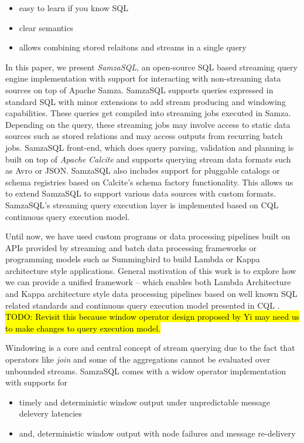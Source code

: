 \documentclass[10pt, conference, compsocconf]{IEEEtran}
\begin{document}
\begin{itemize}
\item easy to learn if you know SQL
\item clear semantics 
\item allows combining stored relaitons and streams in a single query
\end{itemize}

In this paper, we present \textit{SamzaSQL}, an open-source SQL based  streaming query engine implementation with support for interacting with non-streaming data sources on top of Apache Samza. SamzaSQL supports queries expressed in standard SQL with minor extensions to add stream producing and windowing capabilities. These queries get compiled into streaming jobs executed in Samza. Depending on the query, these streaming jobs may involve access to static data sources such as stored relations and may access outputs from recurring batch jobs. SamzaSQL front-end, which does query parsing, validation and planning is built on top of \textit{Apache Calcite} and supports querying stream data formats such as Avro or JSON. SamzaSQL also includes support for pluggable catalogs or schema registries based on Calcite's schema factory functionality. This allows us to extend SamzaSQL to support various data sources with custom formats. SamzaSQL's streaming query execution layer is implemented based on CQL \cite{arasu2006cql} continuous query execution model.

Until now, we have used custom programs or data processing pipelines built on APIs provided by streaming and batch data processing frameworks or programming models such as Summingbird \cite{boykin2014summingbird} to build Lambda or Kappa architecture style applications. General motivation of this work is to explore how we can provide a unified framework -- which enables both Lambda Architecture and Kappa architecture style data processing pipelines based on well known SQL related standards and continuous query execution model presented in CQL \cite{arasu2006cql}. \hl{TODO: Revisit this because window operator design proposed by Yi may need us to make changes to query execution model.}

Windowing is a core and central concept of stream querying due to the fact that operators like \textit{join} and some of the aggregations cannot be evaluated over unbounded streams. SamzaSQL comes with a widow operator implementation with supports for 

\begin{itemize}
\item timely and deterministic window output under unpredictable message delevery latencies
\item and, deterministic window output with node failures and message re-delivery
\end{itemize}
\end{document}
